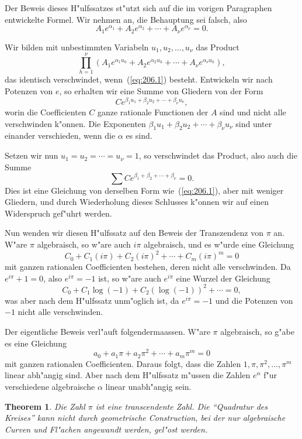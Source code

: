 \documentclass[10pt,a4paper]{article}
\theoremstyle{weberstyle}
\newtheorem{theorem}{Theorem}[section]
\begin{document}
Der Beweis dieses H"ulfssatzes st"utzt sich auf die im vorigen
Paragraphen entwickelte Formel. Wir nehmen an, die Behauptung sei falsch,
also
\begin{equation}\label{eq:206.1}
A_1e^{\alpha_1} + A_2e^{\alpha_2} + \cdots + A_\nu e^{\alpha_\nu} = 0.
\end{equation}

Wir bilden mit unbestimmten Variabeln $u_1,u_2,\dots,u_\nu$ das Product
\[
\prod_{h=1}^{\nu}(A_1e^{\alpha_1u_h} + A_2e^{\alpha_2u_h} + \cdots +
A_\nu e^{\alpha_\nu u_h}),
\]
das identisch verschwindet, wenn~(\ref{eq:206.1}) besteht. Entwickeln wir
nach Potenzen von $e$, so erhalten wir eine Summe von Gliedern von der
Form
\[
Ce^{\beta_1u_1+\beta_2u_2+\cdots+\beta_\nu u_\nu},
\]
worin die Coefficienten $C$ ganze rationale Functionen der $A$ sind und
nicht alle verschwinden k"onnen. Die Exponenten
$\beta_1u_1+\beta_2u_2+\cdots+\beta_\nu u_\nu$ sind unter einander verschieden,
wenn die $\alpha$ es sind.

Setzen wir nun $u_1=u_2=\cdots=u_\nu=1$, so verschwindet das Product,
also auch die Summe
\[
\sum C e^{\beta_1+\beta_2+\cdots+\beta_\nu} = 0.
\]
Dies ist eine Gleichung von derselben Form wie~(\ref{eq:206.1}), aber mit
weniger Gliedern, und durch Wiederholung dieses Schlusses k"onnen wir auf
einen Widerspruch gef"uhrt werden.

Nun wenden wir diesen H"ulfssatz auf den Beweis der Transzendenz von
$\pi$ an. W"are $\pi$ algebraisch, so w"are auch $i\pi$ algebraisch, und es
w"urde eine Gleichung
\begin{equation}\label{eq:206.2}
C_0 + C_1(i\pi) + C_2(i\pi)^2 + \cdots + C_m(i\pi)^m = 0
\end{equation}
mit ganzen rationalen Coefficienten bestehen, deren nicht alle
verschwinden. Da $e^{i\pi}+1=0$, also $e^{i\pi}=-1$ ist, so w"are auch
$e^{i\pi}$ eine Wurzel der Gleichung
\[
C_0 + C_1\log(-1) + C_2(\log(-1))^2 + \cdots = 0,
\]
was aber nach dem H"ulfssatz unm"oglich ist, da $e^{i\pi}=-1$ und die
Potenzen von $-1$ nicht alle verschwinden.

Der eigentliche Beweis verl"auft folgendermaassen. W"are $\pi$
algebraisch, so g"abe es eine Gleichung
\[
a_0 + a_1\pi + a_2\pi^2 + \cdots + a_m\pi^m = 0
\]
mit ganzen rationalen Coefficienten. Daraus folgt, dass die Zahlen
$1,\pi,\pi^2,\dots,\pi^m$ linear abh"angig sind. Aber nach dem
H"ulfssatz m"ussen die Zahlen $e^{\alpha}$ f"ur verschiedene algebraische
$\alpha$ linear unabh"angig sein.

\begin{theorem}
Die Zahl $\pi$ ist eine transcendente Zahl. Die ``Quadratur des
Kreises'' kann nicht durch geometrische Construction, bei der nur
algebraische Curven und Fl"achen angewandt werden, gel"ost werden.
\end{theorem}
\end{document}
